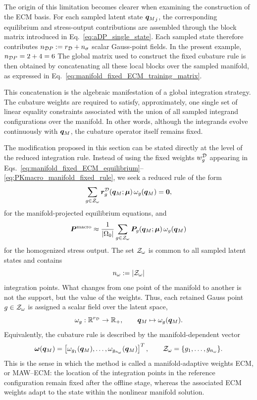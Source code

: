 \documentclass[11pt,a4paper]{article}
\begin{document}
The origin of this limitation becomes clearer when examining the construction
of the ECM basis. For each sampled latent state ${\bm{q}_M}_j$, the corresponding equilibrium and stress-output
contributions are assembled through the block matrix introduced in
Eq.~\eqref{eq:aDP_single_state}. Each sampled state therefore contributes $n_{\mathcal{D}P}:=r_{\mathcal{D}}+n_{\sigma}$
scalar Gauss-point fields. In the present example, $n_{\mathcal{D}P} = 2 + 4 = 6$
The global matrix used to construct the fixed cubature rule is then obtained by
concatenating all these local blocks over the sampled manifold, as expressed in
Eq.~\eqref{eq:manifold_fixed_ECM_training_matrix}.

This concatenation is the algebraic manifestation of a global integration
strategy. The cubature weights are required to satisfy, approximately, one
single set of linear equality constraints associated with the union of all
sampled integrand configurations over the manifold. In other words, although
the integrands evolve continuously with \(\bm{q}_M\), the cubature operator itself
remains fixed.

The modification proposed in this section can be stated directly at the level
of the reduced integration rule. Instead of using the fixed weights
\(w^{\mathcal{D}}_{g}\) appearing in
Eqs.~\eqref{eq:manifold_fixed_ECM_equilibrium}--%
\eqref{eq:PKmacro_manifold_fixed_rule}, we seek a reduced rule of the form
\begin{equation}
\label{eq:MAW_ECM_equilibrium_intro}
    \sum_{g\in\mathcal{Z}_{\omega}}
    \bm{r}^{\mathcal{D}}_{g}(\bm{q}_M;\bm{\mu})\,\omega_{g}(\bm{q}_M)
    =
    \bm{0},
\end{equation}
for the manifold-projected equilibrium equations, and
\begin{equation}
\label{eq:MAW_ECM_PK_intro}
    \bm{P}^{\mathrm{macro}}
    \approx
    \frac{1}{|\Omega_0|}
    \sum_{g\in\mathcal{Z}_{\omega}}
    \boldsymbol{P}_g(\bm{q}_M;\bm{\mu})\,\omega_{g}(\bm{q}_M)
\end{equation}
for the homogenized stress output. The set \(\mathcal{Z}_{\omega}\) is common to all
sampled latent states and contains
\[
    n_{\omega} := |\mathcal{Z}_{\omega}|
\]
integration points. What changes from one point of the manifold to another is
not the support, but the value of the weights. Thus, each retained Gauss point \(g\in\mathcal{Z}_{\omega}\) is assigned a scalar field over
the latent space,
\[
    \omega_{g}:\mathbb{R}^{r_{\mathcal{D}}}\rightarrow\mathbb{R}_{+},
    \qquad
    \bm{q}_M\mapsto \omega_{g}(\bm{q}_M).
\]
Equivalently, the cubature rule is described by the manifold-dependent vector
\[
    \bm{\omega}(\bm{q}_M)
    =
    \left[
    \omega_{g_1}(\bm{q}_M),
    \ldots,
    \omega_{g_{n_{\omega}}}(\bm{q}_M)
    \right]^T,
    \qquad
    \mathcal{Z}_{\omega}=\{g_1,\ldots,g_{n_{\omega}}\}.
\]
This is the sense in which the method is called a
manifold-adaptive weights ECM, or MAW--ECM: the location of the  integration points in the reference configuration  remain fixed
after the offline stage, whereas the associated ECM weights adapt to the
state within the nonlinear manifold solution.
\end{document}
